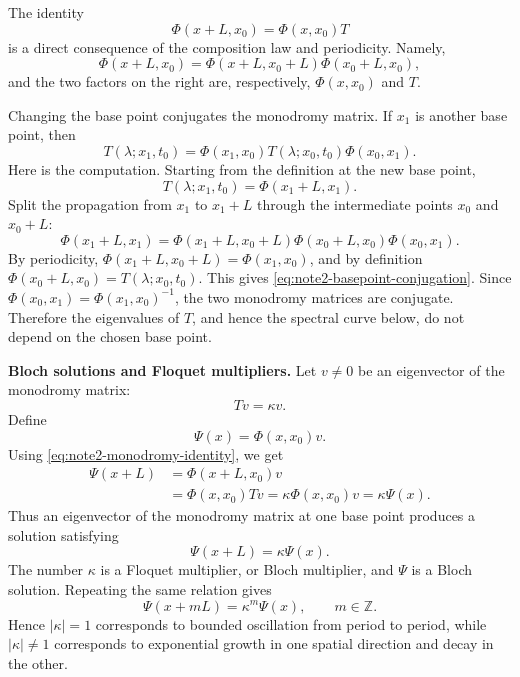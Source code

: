\documentclass{amsart}
\newcounter{note}
\numberwithin{equation}{hw}
\newcommand{\noteheading}[1]{\vspace{1em}\noindent\textbf{#1}}
\begin{document}
The identity
\begin{equation}
\Phi(x+L,x_0)=\Phi(x,x_0)T
\label{eq:note2-monodromy-identity}
\end{equation}
is a direct consequence of the composition law and periodicity.  Namely,
\[
\Phi(x+L,x_0)
=
\Phi(x+L,x_0+L)\Phi(x_0+L,x_0),
\]
and the two factors on the right are, respectively,
\(\Phi(x,x_0)\) and \(T\).

Changing the base point conjugates the monodromy matrix.  If
\(x_1\) is another base point, then
\begin{equation}
T(\lambda;x_1,t_0)
=
\Phi(x_1,x_0)T(\lambda;x_0,t_0)\Phi(x_0,x_1).
\label{eq:note2-basepoint-conjugation}
\end{equation}
Here is the computation.  Starting from the definition at the new base
point,
\[
T(\lambda;x_1,t_0)
=
\Phi(x_1+L,x_1).
\]
Split the propagation from \(x_1\) to \(x_1+L\) through the intermediate
points \(x_0\) and \(x_0+L\):
\[
\Phi(x_1+L,x_1)
=
\Phi(x_1+L,x_0+L)\Phi(x_0+L,x_0)\Phi(x_0,x_1).
\]
By periodicity,
\(\Phi(x_1+L,x_0+L)=\Phi(x_1,x_0)\), and by definition
\(\Phi(x_0+L,x_0)=T(\lambda;x_0,t_0)\).  This gives
\eqref{eq:note2-basepoint-conjugation}.  Since
\(\Phi(x_0,x_1)=\Phi(x_1,x_0)^{-1}\), the two monodromy matrices are
conjugate.
Therefore the eigenvalues of \(T\), and hence the spectral curve below,
do not depend on the chosen base point.

\noteheading{Bloch solutions and Floquet multipliers.}
Let \(v\ne0\) be an eigenvector of the monodromy matrix:
\begin{equation}
Tv=\kappa v.
\label{eq:note2-monodromy-eigenvalue}
\end{equation}
Define
\begin{equation}
\Psi(x)=\Phi(x,x_0)v.
\label{eq:note2-bloch-from-eigenvector}
\end{equation}
Using \eqref{eq:note2-monodromy-identity}, we get
\begin{align}
\Psi(x+L)
&=
\Phi(x+L,x_0)v
\nonumber\\
&=
\Phi(x,x_0)Tv
=
\kappa\Phi(x,x_0)v
=
\kappa\Psi(x).
\label{eq:note2-bloch-relation}
\end{align}
Thus an eigenvector of the monodromy matrix at one base point produces a
solution satisfying
\begin{equation}
\Psi(x+L)=\kappa\Psi(x).
\label{eq:note2-bloch-condition}
\end{equation}
The number \(\kappa\) is a Floquet multiplier, or Bloch multiplier, and
\(\Psi\) is a Bloch solution.  Repeating the same relation gives
\begin{equation}
\Psi(x+mL)=\kappa^m\Psi(x),
\qquad
m\in\mathbb{Z}.
\label{eq:note2-bloch-iterate}
\end{equation}
Hence \(|\kappa|=1\) corresponds to bounded oscillation from period to
period, while \(|\kappa|\ne1\) corresponds to exponential growth in one
spatial direction and decay in the other.
\end{document}
